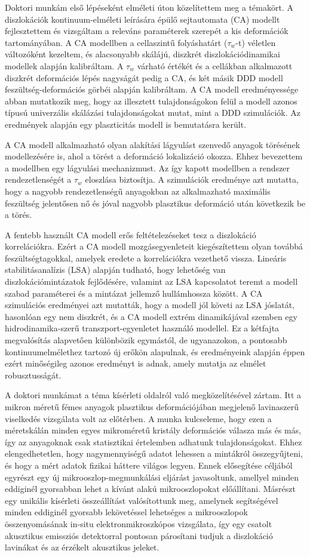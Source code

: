 Doktori munkám első lépéseként elméleti úton közelítettem meg a témakört. A diszlokációk kontinuum-elméleti leírására épülő sejtautomata (CA) modellt fejlesztettem és vizsgáltam a releváns paraméterek szerepét a kis deformációk tartományában. A CA modellben a cellaszintű folyáshatárt ($\tau_w$-t) véletlen változóként kezeltem, és alacsonyabb skálájú, diszkrét diszlokációdinamikai modellek alapján kalibráltam. A $\tau_w$ várható értékét és a cellákban alkalmazott diszkrét deformációs lépés nagyságát pedig a CA, és két másik DDD modell feszültség-deformációs görbéi alapján kalibráltam. A CA modell eredményessége abban mutatkozik meg, hogy az illesztett tulajdonságokon felül a modell azonos típusú univerzális skálázási tulajdonságokat mutat, mint a DDD szimulációk. Az eredmények alapján egy plaszticitás modell is bemutatásra került.

A CA modell alkalmazható olyan alakítási lágyulást szenvedő anyagok törésének modellezésére is, ahol a törést a deformáció lokalizáció okozza. Ehhez bevezettem a modellben egy lágyulási mechanizmust. Az így kapott modellben a rendszer rendezetlenségét a $\tau_w$ eloszlása biztosítja. A szimulációk eredménye azt mutatta, hogy a nagyobb rendezetlenségű anyagokban az alkalmazható maximális feszültség jelentősen nő és jóval nagyobb plasztikus deformáció után következik be a törés.

A fentebb használt CA modell erős feltételezéseket tesz a diszlokáció korrelációkra. Ezért a CA modell mozgásegyenleteit kiegészítettem olyan továbbá feszültségtagokkal, amelyek eredete a korrelációkra vezethető vissza. Lineáris stabilitásanalízis (LSA) alapján tudható, hogy lehetőség van diszlokációmintázatok fejlődésére, valamint az LSA kapcsolatot teremt a modell szabad paraméterei és a mintázat jellemző hullámhossza között. A CA szimulációs eredményei azt mutatták, hogy a modell jól követi az LSA jóslatát, hasonlóan egy nem diszkrét, és a CA modell extrém dinamikájával szemben egy hidrodinamika-szerű transzport-egyenletet használó modellel. Ez a kétfajta megvalósítás alapvetően különbözik egymástól, de ugyanazokon, a pontosabb kontinuumelmélethez tartozó új erőkön alapulnak, és eredményeink alapján éppen ezért minőségileg azonos eredményt is adnak, amely mutatja az elmélet robusztusságát.

A doktori munkámat a téma kísérleti oldalról való megközelítésével zártam. Itt a mikron méretű fémes anyagok plasztikus deformációjában megjelenő lavinaszerű viselkedés vizsgálata volt az előtérben. A munka kulcseleme, hogy ezen a méretskálán minden egyes mikroméretű kristály deformációs válasza más és más, így az anyagoknak csak statisztikai értelemben adhatunk tulajdonságokat. Ehhez elengedhetetlen, hogy nagymennyiségű adatot lehessen a mintákról összegyűjteni, és hogy a mért adatok fizikai háttere világos legyen. Ennek elősegítése céljából egyrészt egy új mikrooszlop-megmunkálási eljárást javasoltunk, amellyel minden eddiginél gyorsabban lehet a kívánt alakú mikrooszlopokat előállítani. Másrészt egy unikális kísérleti összeállítást valósítottunk meg, amelynek segítségével minden eddiginél gyorsabb lekövetéssel lehetséges a mikrooszlopok összenyomásának in-situ elektronmikroszkópos vizsgálata, így egy csatolt akusztikus emissziós detektorral pontosan párosítani tudjuk a diszlokáció lavinákat és az érzékelt akusztikus jeleket.
